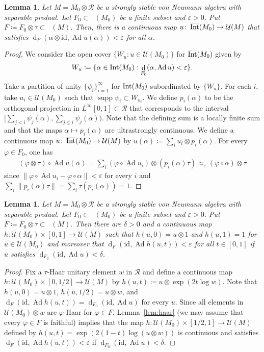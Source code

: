 \documentclass[12pt,nosumlimits,nonamelimits]{amsart}
\newtheorem{lem}[thm]{Lemma}
\theoremstyle{remark}
\newcommand{\cR}{\mathcal{R}}
\newcommand{\cU}{\mathcal{U}}
\newcommand{\ve}{\varepsilon}
\newcommand{\vp}{\varphi}
\newcommand{\id}{\mathrm{id}}
\DeclareMathOperator{\Int}{\smash{\overline{\mathrm{Int}}}}
\DeclareMathOperator{\Ad}{Ad}
\newcommand{\ns}{\mathop{\mathcal{S}_{\mathrm{n}}}}
\DeclareMathOperator{\supp}{supp}
\DeclareMathOperator{\dist}{d}
\begin{document}
\begin{lem}\label{lem:firstselection}
Let $M=M_0\otimes \cR$ be a strongly stable 
von Neumann algebra with separable predual. 
Let $F_0\subset\ns(M_0)$ be a finite subset and $\ve>0$. 
Put $F\coloneqq F_0\otimes\tau\subset\ns(M)$. 
Then, there is a continuous map 
$u\colon \Int(M_0)\to\cU(M)$ that satisfies
$\dist_F(\alpha\otimes\id,\Ad u(\alpha)) < \ve$ for all $\alpha$.
\end{lem}

\begin{proof}
We consider the open cover $\{ W_u : u\in\cU(M_0)\}$ for $\Int(M_0)$ given by 
\[
W_u\coloneqq\{ \alpha\in\Int(M_0) : \dist_{F_0}(\alpha,\Ad u)<\ve\}.
\]
Take a partition of unity $\{\psi_i\}_{i=1}^\infty$ for $\Int(M_0)$ 
subordinated by $\{ W_u\}$. 
For each $i$, take $u_i\in\cU(M_0)$ such that $\supp\psi_i\subset W_{u_i}$. 
We define $p_i(\alpha)$ to be the orthogonal projection 
in $L^\infty[0,1]\subset \cR$ that 
corresponds to the interval 
$[\sum_{j<i}\psi_j(\alpha), \sum_{j\le i}\psi_j(\alpha))$. 
Note that the defining sum is a locally finite sum and that 
the maps $\alpha\mapsto p_i(\alpha)$ are ultrastrongly continuous. 
We define a continuous map $u\colon \Int(M_0)\to \cU(M)$ by 
$u(\alpha) \coloneqq \sum_i u_i \otimes p_i(\alpha)$.
For every $\vp\in F_0$, one has 
\begin{align*}
(\vp \otimes \tau)\circ\Ad u(\alpha) 
 = \sum_i (\vp\circ\Ad u_i) \otimes (p_i(\alpha)\tau)
 \approx_\ve(\vp\circ\alpha)\otimes\tau
\end{align*}
since $\|\vp\circ\Ad u_i-\vp\circ\alpha\|<\ve$ for every $i$ and 
$\sum_i \|p_i(\alpha)\tau\|=\sum_i \tau(p_i(\alpha))=1$. 
\end{proof}

\begin{lem}\label{lem:bridge}
Let $M=M_0\otimes \cR$ be a strongly stable von Neumann algebra 
with separable predual. 
Let $F_0\subset \ns(M_0)$ be a finite subset and $\ve>0$. 
Put $F\coloneqq F_0\otimes\tau\subset\ns(M)$.
Then there are $\delta>0$ and a continuous map 
$h\colon \cU(M_0)\times[0,1]\to\cU(M)$ 
such that $h(u,0)=u\otimes1$ and $h(u,1)=1$ for $u\in\cU(M_0)$ 
and moreover that 
$\dist_F(\id,\Ad h(u,t))<\ve$ for all $t\in[0,1]$ 
if $u$ satisfies $\dist_{F_0}(\id, \Ad u)<\delta$. 
\end{lem}

\begin{proof}
Fix a $\tau$-Haar unitary element $w$ in $\cR$ 
and define a continuous map 
$h\colon \cU(M_0)\times[0,1/2]\to\cU(M)$ by 
$h(u,t)\coloneqq u\otimes \exp(2t\log w)$. 
Note that $h(u,0)=u\otimes1$, 
$h(u,1/2)=u\otimes w$, and 
$\dist_F(\id,\Ad h(u,t))=\dist_{F_0}(\id,\Ad u)$ for every $u$. 
Since all elements in $\cU(M_0)\otimes w$ 
are $\vp$-Haar for $\vp\in F$, 
Lemma~\ref{lem:haar} (we may assume that 
every $\vp\in F$ is faithful) implies that the map 
$h\colon \cU(M_0)\times[1/2,1]\to\cU(M)$ defined by 
$h(u,t)=\exp( 2(1-t)\log(u\otimes w) )$ is continuous and 
satisfies 
$\dist_F(\id,\Ad h(u,t))<\ve$ 
if $\dist_{F_0}(\id, \Ad u)<\delta$.
\end{proof}
\end{document}
